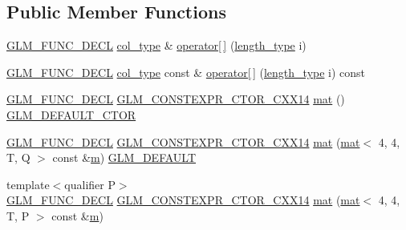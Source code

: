 \subsection*{Public Member Functions}
\begin{DoxyCompactItemize}
\item 
\hyperlink{setup_8hpp_ab2d052de21a70539923e9bcbf6e83a51}{G\+L\+M\+\_\+\+F\+U\+N\+C\+\_\+\+D\+E\+CL} \hyperlink{structglm_1_1mat_3_014_00_014_00_01_t_00_01_q_01_4_aad430dc291d0156d573c434be7fdecc1}{col\+\_\+type} \& \hyperlink{structglm_1_1mat_3_014_00_014_00_01_t_00_01_q_01_4_a45140ed8c7f6d53ed8fa2ddc04ac1bb2}{operator\mbox{[}$\,$\mbox{]}} (\hyperlink{structglm_1_1mat_3_014_00_014_00_01_t_00_01_q_01_4_ae06c2957874bbff5701b304668b5cb01}{length\+\_\+type} i)
\item 
\hyperlink{setup_8hpp_ab2d052de21a70539923e9bcbf6e83a51}{G\+L\+M\+\_\+\+F\+U\+N\+C\+\_\+\+D\+E\+CL} \hyperlink{structglm_1_1mat_3_014_00_014_00_01_t_00_01_q_01_4_aad430dc291d0156d573c434be7fdecc1}{col\+\_\+type} const  \& \hyperlink{structglm_1_1mat_3_014_00_014_00_01_t_00_01_q_01_4_a03fe2789c5b3555f79883dae649167f4}{operator\mbox{[}$\,$\mbox{]}} (\hyperlink{structglm_1_1mat_3_014_00_014_00_01_t_00_01_q_01_4_ae06c2957874bbff5701b304668b5cb01}{length\+\_\+type} i) const
\item 
\hyperlink{setup_8hpp_ab2d052de21a70539923e9bcbf6e83a51}{G\+L\+M\+\_\+\+F\+U\+N\+C\+\_\+\+D\+E\+CL} \hyperlink{setup_8hpp_a0900f9145e68bf6061b6f5e7be3fa751}{G\+L\+M\+\_\+\+C\+O\+N\+S\+T\+E\+X\+P\+R\+\_\+\+C\+T\+O\+R\+\_\+\+C\+X\+X14} \hyperlink{structglm_1_1mat_3_014_00_014_00_01_t_00_01_q_01_4_ad5a56ae437785b4a19e5423d00e34f80}{mat} () \hyperlink{setup_8hpp_afb97a4e995bc004c0cbbfa22125b80ba}{G\+L\+M\+\_\+\+D\+E\+F\+A\+U\+L\+T\+\_\+\+C\+T\+OR}
\item 
\hyperlink{setup_8hpp_ab2d052de21a70539923e9bcbf6e83a51}{G\+L\+M\+\_\+\+F\+U\+N\+C\+\_\+\+D\+E\+CL} \hyperlink{setup_8hpp_a0900f9145e68bf6061b6f5e7be3fa751}{G\+L\+M\+\_\+\+C\+O\+N\+S\+T\+E\+X\+P\+R\+\_\+\+C\+T\+O\+R\+\_\+\+C\+X\+X14} \hyperlink{structglm_1_1mat_3_014_00_014_00_01_t_00_01_q_01_4_a3df7423fcb4eb04f5ad5e24ce5a8d7ca}{mat} (\hyperlink{structglm_1_1mat}{mat}$<$ 4, 4, T, Q $>$ const \&\hyperlink{_s_d_l__opengl__glext_8h_af593500c283bf1a787a6f947f503a5c2}{m}) \hyperlink{setup_8hpp_aefce7051c376a64ba89fa93a9f63bc2c}{G\+L\+M\+\_\+\+D\+E\+F\+A\+U\+LT}
\item 
{\footnotesize template$<$qualifier P$>$ }\\\hyperlink{setup_8hpp_ab2d052de21a70539923e9bcbf6e83a51}{G\+L\+M\+\_\+\+F\+U\+N\+C\+\_\+\+D\+E\+CL} \hyperlink{setup_8hpp_a0900f9145e68bf6061b6f5e7be3fa751}{G\+L\+M\+\_\+\+C\+O\+N\+S\+T\+E\+X\+P\+R\+\_\+\+C\+T\+O\+R\+\_\+\+C\+X\+X14} \hyperlink{structglm_1_1mat_3_014_00_014_00_01_t_00_01_q_01_4_a9bb105cf95abdde89031315e39bcbe9a}{mat} (\hyperlink{structglm_1_1mat}{mat}$<$ 4, 4, T, P $>$ const \&\hyperlink{_s_d_l__opengl__glext_8h_af593500c283bf1a787a6f947f503a5c2}{m})

\end{DoxyCompactItemize}
